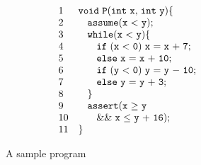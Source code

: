 \begin{figure}[t]
\begin{subfigure}{0.5\textwidth}
    \raggedright
    \vspace{0.5cm}

\vspace{-0.2cm} \[
 \begin{array}{ll}
1 & \code{void~P(int ~x{,} ~int~y)\{} \\
2 & \code{~~~ assume(x~{<}~y);}  \\
3 & \code{~~~ while(x~{<}~y)\{}  \\
4 & \code{~~~ \quad if~(x~{<}~0)~x~{=}~x~{+}~7;}  \\
5 & \code{~~~ \quad else~ x~{=}~x~{+}~10;}\\
6 & \code{~~~ \quad if~(y~{<}~0)~y~{=}~y~{-}~10;} \\
7 & \code{~~~ \quad else~ y~{=}~y~{+}~3;}\\
8 & \code{~~~\}} \\
9 & \code{~~~assert(x~{\geq}~y}\\
10 & \code{~~~\quad \&\&~x~{\leq}~y~{+}~16);}\\
11  & \}
\end{array}
\]
    \vspace{-0.2cm}
    \caption{A sample program}
    \label{fig:running:example:program}
\end{subfigure}%
\begin{subfigure}{.5\textwidth}
      \centering

\end{subfigure}
\end{figure}
